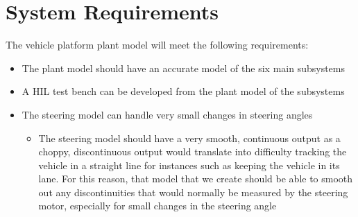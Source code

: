 \documentclass[letterpaper,12pt]{article}   %
\begin{document}

\section{System Requirements}
The vehicle platform plant model will meet the following requirements:
\begin{itemize}
    \item The plant model should have an accurate model of the six main subsystems
    \item A HIL test bench can be developed from the plant model of the subsystems
    \item The steering model can handle very small changes in steering angles
    \begin{itemize}
    		\item The steering model should have a very smooth, continuous output as a choppy, discontinuous output would translate into difficulty tracking the vehicle in a straight line for instances such as keeping the vehicle in its lane. For this reason, that model that we create should be able to smooth out any discontinuities that would normally be measured by the steering motor, especially for small changes in the steering angle
    \end{itemize}
\end{itemize}


\end{document}
